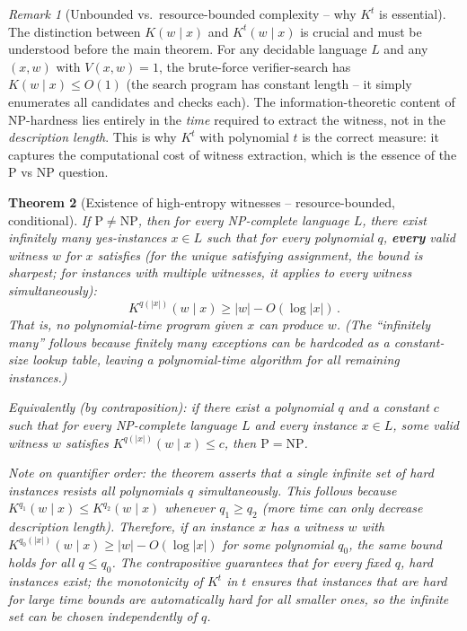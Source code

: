 \documentclass[aps,prd,twocolumn,superscriptaddress,nofootinbib]{revtex4-2}
\newtheorem{theorem}{Theorem}[section]
\theoremstyle{definition}
\theoremstyle{remark}
\newtheorem{remark}[theorem]{Remark}
\newcommand{\NP}{\mathrm{NP}}
\newcommand{\PP}{\mathrm{P}}
\begin{document}
\begin{remark}[Unbounded vs.\ resource-bounded complexity -- why $K^t$ is essential]
\label{rem:bounded-vs-unbounded}
The distinction between $K(w \mid x)$ and $K^t(w \mid x)$ is crucial and must be understood before the main theorem. For any decidable language $L$ and any $(x, w)$ with $V(x,w) = 1$, the brute-force verifier-search has $K(w \mid x) \leq O(1)$ (the search program has constant length -- it simply enumerates all candidates and checks each). The information-theoretic content of NP-hardness lies entirely in the \textit{time} required to extract the witness, not in the \textit{description length}. This is why $K^t$ with polynomial $t$ is the correct measure: it captures the computational cost of witness extraction, which is the essence of the $\PP$ vs $\NP$ question.
\end{remark}

\begin{theorem}[Existence of high-entropy witnesses -- resource-bounded, conditional]
\label{thm:high_entropy}
If $\PP \neq \NP$, then for every NP-complete language $L$, there exist infinitely many yes-instances $x \in L$ such that for every polynomial $q$, \textbf{every} valid witness $w$ for $x$ satisfies (for the unique satisfying assignment, the bound is sharpest; for instances with multiple witnesses, it applies to every witness simultaneously):
\begin{equation}
K^{q(|x|)}(w \mid x) \geq |w| - O(\log |x|)\,.
\label{eq:high_entropy}
\end{equation}
That is, no polynomial-time program given $x$ can produce $w$. (The ``infinitely many'' follows because finitely many exceptions can be hardcoded as a constant-size lookup table, leaving a polynomial-time algorithm for all remaining instances.)

Equivalently (by contraposition): if there exist a polynomial $q$ and a constant $c$ such that for every NP-complete language $L$ and every instance $x \in L$, some valid witness $w$ satisfies $K^{q(|x|)}(w \mid x) \leq c$, then $\PP = \NP$.

Note on quantifier order: the theorem asserts that a \emph{single} infinite set of hard instances resists all polynomials $q$ simultaneously. This follows because $K^{q_1}(w \mid x) \leq K^{q_2}(w \mid x)$ whenever $q_1 \geq q_2$ (more time can only decrease description length). Therefore, if an instance $x$ has a witness $w$ with $K^{q_0(|x|)}(w \mid x) \geq |w| - O(\log |x|)$ for some polynomial $q_0$, the same bound holds for all $q \leq q_0$. The contrapositive guarantees that for every fixed $q$, hard instances exist; the monotonicity of $K^t$ in $t$ ensures that instances that are hard for large time bounds are automatically hard for all smaller ones, so the infinite set can be chosen independently of $q$.
\end{theorem}
\end{document}

